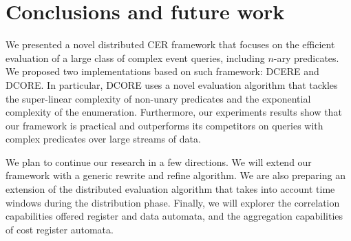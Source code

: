 \chapter{Conclusions and future work}\label{chapter:conclusion}

We presented a novel distributed CER framework that focuses on the efficient evaluation of a large class of complex event queries, including $n$-ary predicates. We proposed two implementations based on such framework: DCERE and DCORE. In particular, DCORE uses a novel evaluation algorithm that tackles the super-linear complexity of non-unary predicates and the exponential complexity of the enumeration. Furthermore, our experiments results show that our framework is practical and outperforms its competitors on queries with complex predicates over large streams of data.

We plan to continue our research in a few directions. We will extend our framework with a generic rewrite and refine algorithm. We are also preparing an extension of the distributed evaluation algorithm that takes into account time windows during the distribution phase. Finally, we will explorer the correlation capabilities offered register and data automata, and the aggregation capabilities of cost register automata.
